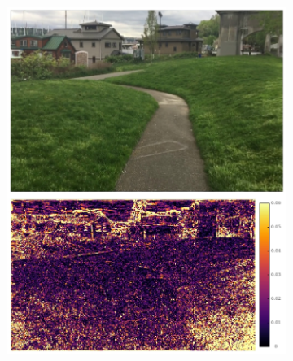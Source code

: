\documentclass{article}
\begin{document}
\begin{figure}
\begin{subfigure}{0.25\textwidth}
    \includegraphics[width=1\linewidth]{qua_imgs/720p_240fps_1_rrin.jpg}


\end{subfigure}
\end{figure}
\end{document}
